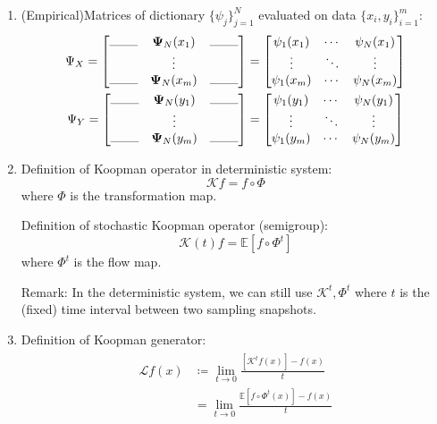 \documentclass{article}[11]
\begin{document}
\begin{enumerate}
		\item (Empirical)Matrices of dictionary $\{\psi_j\}_{j=1}^N$ evaluated on data $\{x_i, y_i\}_{i=1}^m$:
		\begin{gather*}
			\Psi_X = \begin{bmatrix}
				\rule{0.8cm}{0.1mm} & \mathbf{\Psi}_N(x_1) & \rule{0.8cm}{0.1mm} \\
				& \vdots &   \\
				\rule{0.8cm}{0.1mm} & \mathbf{\Psi}_N(x_m) & \rule{0.8cm}{0.1mm}
			\end{bmatrix}
			=\begin{bmatrix}
				\psi_1(x_1) & \cdots & \psi_{N}(x_1) \\
				\vdots & \ddots & \vdots \\
				\psi_1(x_m) & \cdots & \psi_{N}(x_m)
			\end{bmatrix} \\
			\Psi_Y = \begin{bmatrix}
				\rule{0.8cm}{0.1mm} & \mathbf{\Psi}_N(y_1) & \rule{0.8cm}{0.1mm} \\
				& \vdots &   \\
				\rule{0.8cm}{0.1mm} & \mathbf{\Psi}_N(y_m) & \rule{0.8cm}{0.1mm}
			\end{bmatrix}
			= \begin{bmatrix}
				\psi_1(y_1) & \cdots & \psi_{N}(y_1) \\
				\vdots & \ddots & \vdots \\
				\psi_1(y_m) & \cdots & \psi_{N}(y_m)
			\end{bmatrix}
		\end{gather*}
		
		\item Definition of Koopman operator in deterministic system:
		$$\mathcal{K}f = f\circ\Phi$$
		where $\Phi$ is the transformation map.
		
		Definition of stochastic Koopman operator (semigroup):
		$$\mathcal{K}(t)f = \mathbb{E}[f\circ\Phi^{t}]$$
		where $\Phi^{t}$ is the flow map.
		
		Remark: In the deterministic system, we can still use $\mathcal{K}^t,\Phi^t$ where $t$ is the (fixed) time interval between two sampling snapshots.
		\item Definition of Koopman generator:
		\begin{gather}\label{def_generator}
			\begin{aligned}
				\mathcal{L}f(x) &\coloneqq \lim_{t \to 0} \frac{[\mathcal{K}^{t}f(x)] - f(x)}{t} \\
				&= \lim_{t \to 0} \frac{\mathbb{E}[f\circ\Phi^{t}(x)] - f(x)}{t}
			\end{aligned}
		\end{gather}
		
	\end{enumerate}
	
\end{document}
